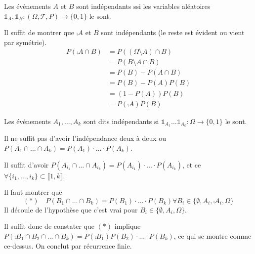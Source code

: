 \documentclass[10pt,a4paper,notitlepage ]{report}
\begin{document}
\begin{propriete}
	Les événements $A$ et $B$ sont indépendants ssi les variables aléatoires $\mathds{1}_A, \mathds{1}_B : (\Omega, \mathcal T, P) \rightarrow \{0,1\}$ le sont.
\end{propriete}

\begin{demo}
	Il suffit de montrer que $\comp A$ et $B$ sont indépendants (le reste est évident ou vient par symétrie).
	\begin{align*}
		P(\comp A\cap B) &= P((\Omega \setminus A) \cap B) \\
		&= P(B \setminus A\cap B) \\
		&= P(B) - P(A\cap B) \\
		&= P(B) - P(A)P(B) \\
		&= (1-P(A))P(B) \\
		&= P(\comp A)P(B)
	\end{align*} 
\end{demo}

\begin{definition}
	Les événements $A_1,\dots,A_k$ sont dits indépendants si $\mathds 1_{A_1} \dots \mathds 1_{A_k} : \Omega \rightarrow \{0,1\}$ le sont.
\end{definition}

\begin{rem}
	Il ne suffit pas d'avoir l'indépendance deux à deux ou $P(A_1 \cap \dots \cap A_k) = P(A_1) \cdot \dots \cdot P(A_k)$.
\end{rem}

\begin{propriete}
	Il suffit d'avoir $P(A_{i_1} \cap \dots \cap A_{i_k}) = P(A_{i_1}) \cdot \dots \cdot P(A_{i_k})$, et ce $\forall \{i_1, \dots, i_k\} \subset \llbracket 1,k \rrbracket$.
\end{propriete}

\begin{demo}
	Il faut montrer que
	\[ (*) \quad P(B_1 \cap \dots \cap B_k) = P(B_1) \cdot \dots \cdot P(B_k) \forall B_i \in \{\emptyset, A_i, \comp{A_i}, \Omega\}	\]
	Il découle de l'hypothèse que c'est vrai pour $B_i \in \{ \emptyset, A_i, \Omega\}$.
	
	Il suffit donc de constater que $(*)$ implique $P (\comp{B_1} \cap B_2 \cap \dots \cap B_k) = P(\comp{B_1})P(B_2) \cdot \dots \cdot P(B_k)$, ce qui se montre comme ce-dessus. On conclut par récurrence finie.
\end{demo}
\end{document}
